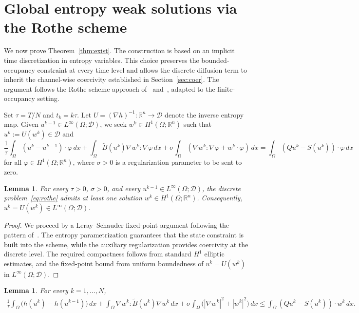 \documentclass{article}
\newtheorem{lemma}[theorem]{Lemma}
\newcommand{\R}{\mathbb{R}}
\newcommand{\D}{\mathcal{D}}
\newcommand{\Be}{\widetilde{B}}       %
\begin{document}
\section{Global entropy weak solutions via the Rothe scheme}
\label{sec:exist}

We now prove Theorem~\ref{thm:exist}. The construction is based on an
implicit time discretization in entropy variables. This choice preserves
the bounded-occupancy constraint at every time level and allows the
discrete diffusion term to inherit the channel-wise coercivity
established in Section~\ref{sec:coer}. The argument follows the Rothe scheme approach
of~\cite[Section~4]{Jungel2015} and~\cite[Proposition~3.1]{JungelStelzer2013},
adapted to the finite-occupancy setting.

Set $\tau=T/N$ and $t_k=k\tau$. Let $U=(\nabla h)^{-1}:\R^n\to\D$
denote the inverse entropy map. Given $u^{k-1}\in L^\infty(\Omega;\D)$,
we seek $w^k\in H^1(\Omega;\R^n)$ such that $u^k:=U(w^k)\in\D$ and
\begin{equation}\label{eq:rothe}
  \frac{1}{\tau}\int_\Omega(u^k-u^{k-1})\cdot\varphi\,dx
  + \int_\Omega\Be(u^k)\nabla w^k:\nabla\varphi\,dx
  + \sigma\int_\Omega(\nabla w^k:\nabla\varphi + w^k\cdot\varphi)\,dx
  = \int_\Omega(Qu^k-S(u^k))\cdot\varphi\,dx
\end{equation}
for all $\varphi\in H^1(\Omega;\R^n)$, where $\sigma>0$ is a
regularization parameter to be sent to zero.

\begin{lemma}\label{lem:rothe_exist}
For every $\tau>0$, $\sigma>0$, and every $u^{k-1}\in L^\infty(\Omega;\D)$,
the discrete problem~\eqref{eq:rothe} admits at least one solution
$w^k\in H^1(\Omega;\R^n)$. Consequently, $u^k=U(w^k)\in L^\infty(\Omega;\D)$.
\end{lemma}

\begin{proof}
We proceed by a Leray--Schauder fixed-point argument following the
pattern of~\cite[Theorem~1]{Jungel2015}. The entropy
parametrization guarantees that the state constraint is built into the
scheme, while the auxiliary regularization provides coercivity at the
discrete level. The required compactness follows from standard $H^1$
elliptic estimates, and the fixed-point bound from uniform boundedness
of $u^k=U(w^k)$ in $L^\infty(\Omega;\D)$.
\end{proof}

\begin{lemma}\label{lem:rothe_entropy}
For every $k=1,\dots,N$,
\begin{align*}
  \frac{1}{\tau}\int_\Omega\bigl(h(u^k)-h(u^{k-1})\bigr)\,dx
  + \int_\Omega\nabla w^k:\Be(u^k)\nabla w^k\,dx
  + \sigma\int_\Omega\bigl(|\nabla w^k|^2+|w^k|^2\bigr)\,dx
  \le \int_\Omega(Qu^k-S(u^k))\cdot w^k\,dx.
\end{align*}
\end{lemma}
\end{document}
